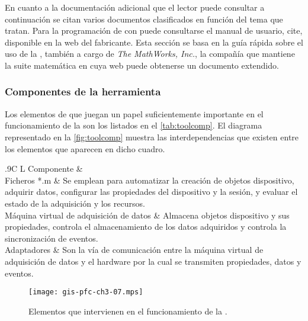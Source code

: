 En cuanto a la documentación adicional que el lector puede consultar a
continuación se citan varios documentos clasificados en función del tema
que tratan. Para la programación de \gui{} con \matlab{} puede consultarse
el manual de usuario, cite, disponible en la web del fabricante. Esta
sección se basa en la guía rápida sobre el uso de la \datx{}, también a
cargo de \emph{The MathWorks, Inc.}, la compañía que mantiene la suite
matemática en cuya web puede obtenerse un documento extendido.


\subsubsection{Componentes de la herramienta}

Los elementos de \matlab{} que juegan un papel suficientemente importante
en el funcionamiento de la \datx{} son los listados en el
\cref{tab:toolcomp}. El diagrama representado en la \vref{fig:toolcomp}
muestra las interdependencias que existen entre los elementos que aparecen
en dicho cuadro.

\begin{table}
	\centering
	\begin{tabulary}{.9\textwidth}{C L}
		\toprule
		Componente &  \\
		\midrule
		Ficheros *.m & Se emplean para automatizar la creación de
		objetos dispositivo, adquirir datos, configurar las
		propiedades del dispositivo y la sesión, y evaluar el
		estado de la adquisición y los recursos.\\
		\midrule
		Máquina virtual de adquisición de datos & Almacena objetos
		dispositivo y sus propiedades, controla el almacenamiento
		de los datos adquiridos y controla la sincronización de
		eventos.\\
		\midrule
		Adaptadores & Son la vía de comunicación entre la máquina
		virtual de adquisición de datos y el hardware por la cual
		se transmiten propiedades, datos y eventos.\\
		\bottomrule
	\end{tabulary}
	\caption[Descripción de los componentes de la \datx{}] {Descripción
	de los componentes de la \datx{}.}
	\label{tab:toolcomp}
\end{table}

\begin{figure}
	\begin{center}
		\texttt{[image: gis-pfc-ch3-07.mps]}
	\end{center}
	\caption[Elementos que intervienen en el funcionamiento de la
	\datx{}]{Elementos que intervienen en el funcionamiento de la
	\datx{}.}
	\label{fig:toolcomp}
\end{figure}

